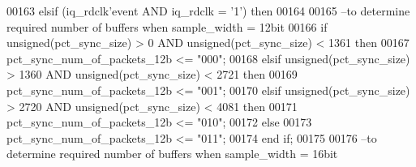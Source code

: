 \begin{DoxyCode}
00163    \textcolor{keywordflow}{elsif} \textcolor{vhdlchar}{(}\textcolor{vhdlchar}{iq_rdclk}\textcolor{vhdlchar}{'}\textcolor{vhdlkeyword}{event} \textcolor{keywordflow}{AND} \textcolor{vhdlchar}{iq_rdclk} \textcolor{vhdlchar}{=} \textcolor{vhdlchar}{'}\textcolor{vhdllogic}{}\textcolor{vhdllogic}{1}\textcolor{vhdlchar}{'}\textcolor{vhdlchar}{)} \textcolor{keywordflow}{then}
00164    
00165 \textcolor{keyword}{      --to determine required number of buffers when sample\_width = 12bit}
00166       \textcolor{keywordflow}{if} \textcolor{comment}{unsigned}\textcolor{vhdlchar}{(}\textcolor{vhdlchar}{pct_sync_size}\textcolor{vhdlchar}{)} \textcolor{vhdlchar}{>} \textcolor{vhdllogic}{}\textcolor{vhdllogic}{0} \textcolor{keywordflow}{AND} \textcolor{comment}{unsigned}\textcolor{vhdlchar}{(}\textcolor{vhdlchar}{pct_sync_size}\textcolor{vhdlchar}{)} \textcolor{vhdlchar}{<} \textcolor{vhdllogic}{}\textcolor{vhdllogic}{1361} \textcolor{keywordflow}{then}
00167          \textcolor{vhdlchar}{pct_sync_num_of_packets_12b} \textcolor{vhdlchar}{<=} \textcolor{vhdllogic}{"000"};
00168       \textcolor{keywordflow}{elsif} \textcolor{comment}{unsigned}\textcolor{vhdlchar}{(}\textcolor{vhdlchar}{pct_sync_size}\textcolor{vhdlchar}{)} \textcolor{vhdlchar}{>} \textcolor{vhdllogic}{}\textcolor{vhdllogic}{1360} \textcolor{keywordflow}{AND} \textcolor{comment}{unsigned}\textcolor{vhdlchar}{(}\textcolor{vhdlchar}{pct_sync_size}\textcolor{vhdlchar}{)} \textcolor{vhdlchar}{<} \textcolor{vhdllogic}{}\textcolor{vhdllogic}{2721} \textcolor{keywordflow}{then} 
00169          \textcolor{vhdlchar}{pct_sync_num_of_packets_12b} \textcolor{vhdlchar}{<=} \textcolor{vhdllogic}{"001"};
00170       \textcolor{keywordflow}{elsif} \textcolor{comment}{unsigned}\textcolor{vhdlchar}{(}\textcolor{vhdlchar}{pct_sync_size}\textcolor{vhdlchar}{)} \textcolor{vhdlchar}{>} \textcolor{vhdllogic}{}\textcolor{vhdllogic}{2720} \textcolor{keywordflow}{AND} \textcolor{comment}{unsigned}\textcolor{vhdlchar}{(}\textcolor{vhdlchar}{pct_sync_size}\textcolor{vhdlchar}{)} \textcolor{vhdlchar}{<} \textcolor{vhdllogic}{}\textcolor{vhdllogic}{4081} \textcolor{keywordflow}{then}
00171          \textcolor{vhdlchar}{pct_sync_num_of_packets_12b} \textcolor{vhdlchar}{<=} \textcolor{vhdllogic}{"010"};
00172       \textcolor{keywordflow}{else} 
00173          \textcolor{vhdlchar}{pct_sync_num_of_packets_12b} \textcolor{vhdlchar}{<=} \textcolor{vhdllogic}{"011"};         
00174       \textcolor{keywordflow}{end} \textcolor{keywordflow}{if};
00175       
00176 \textcolor{keyword}{      --to determine required number of buffers when sample\_width = 16bit}

\end{DoxyCode}
